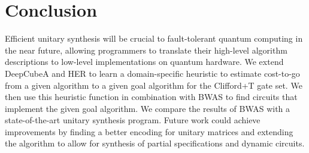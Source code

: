 \documentclass[letterpaper]{article} %
\begin{document}
\section{Conclusion}

Efficient unitary synthesis will be crucial to fault-tolerant quantum computing in the near future,
allowing programmers to translate their high-level algorithm descriptions to low-level implementations on quantum hardware.
We extend DeepCubeA and HER to learn a domain-specific heuristic to
estimate cost-to-go from a given algorithm to a given goal algorithm for the Clifford+T gate set.
We then use this heuristic function in combination with BWAS to find circuits that implement the given goal algorithm.
We compare the results of BWAS with a state-of-the-art unitary synthesis program.
Future work could achieve improvements by finding a better encoding for unitary matrices
and extending the algorithm to allow for synthesis of partial specifications and dynamic circuits.




\end{document}
